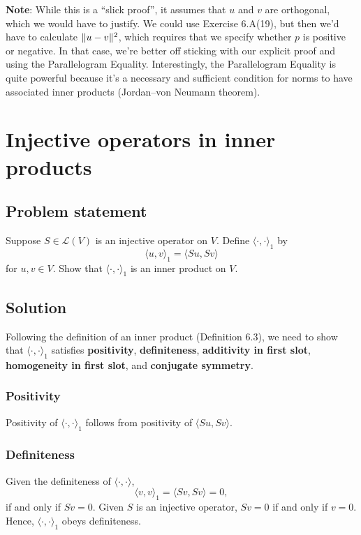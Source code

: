 \documentclass{article}
\begin{document}
\textbf{Note}: While this is a ``slick proof'', it assumes that $u$ and $v$ are orthogonal, which we would have to justify. 
We could use Exercise 6.A(19), but then we'd have to calculate $\lVert u-v\rVert^2$, which requires that we specify whether $p$ is positive or negative. 
In that case, we're better off sticking with our explicit proof and using the Parallelogram Equality. 
Interestingly, the Parallelogram Equality is quite powerful because it's a necessary and sufficient condition for norms to have associated inner products (Jordan–von Neumann theorem).

\clearpage

\renewcommand{\thesection}{24}
\section{Injective operators in inner products}
\subsection*{Problem statement}
Suppose $S\in\mathcal{L}(V)$ is an injective operator on $V$. 
Define $\langle\cdot,\cdot\rangle_1$ by
\[\langle u,v\rangle_1=\langle Su,Sv\rangle\]
for $u,v\in V$. 
Show that $\langle\cdot,\cdot\rangle_1$ is an inner product on $V$.

\subsection*{Solution}
Following the definition of an inner product (Definition 6.3), we need to show that $\langle\cdot,\cdot\rangle_1$ satisfies \textbf{positivity}, \textbf{definiteness}, \textbf{additivity in first slot}, \textbf{homogeneity in first slot}, and \textbf{conjugate symmetry}.

\subsubsection*{Positivity}
Positivity of $\langle\cdot,\cdot\rangle_1$ follows from positivity of $\langle Su,Sv\rangle$.

\subsubsection*{Definiteness}
Given the definiteness of $\langle \cdot,\cdot\rangle$,
\[\langle v,v\rangle_1=\langle Sv,Sv\rangle=0,\]
if and only if $Sv=0$. 
Given $S$ is an injective operator, $Sv=0$ if and only if $v=0$. 
Hence, $\langle\cdot,\cdot\rangle_1$ obeys definiteness.
\end{document}
